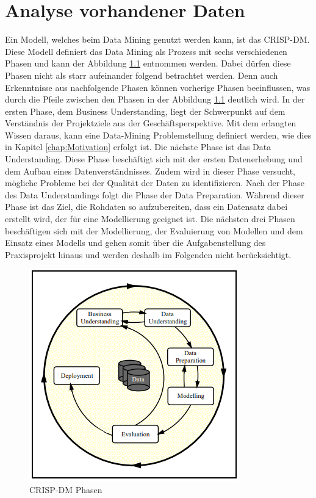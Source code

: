 \chapter{Analyse vorhandener Daten}
\label{chap:kapitel4}

Ein Modell, welches beim Data Mining genutzt werden kann, ist das \ac*{CRISP-DM}. Diese Modell definiert das Data Mining als Prozess mit sechs verschiedenen Phasen und kann der 
Abbildung \ref*{fig:CRISP-DM} entnommen werden. Dabei dürfen diese Phasen nicht als starr aufeinander folgend betrachtet werden. Denn auch Erkenntnisse aus nachfolgende Phasen können vorherige Phasen
beeinflussen, was durch die Pfeile zwischen den Phasen in der Abbildung \ref*{fig:CRISP-DM} deutlich wird. In der ersten Phase, dem Business Understanding, liegt der Schwerpunkt auf dem Verständnis 
der Projektziele aus der Geschäftsperspektive. Mit dem erlangten Wissen daraus, kann eine Data-Mining Problemstellung definiert werden, wie dies in Kapitel \ref*{chap:Motivation} erfolgt ist. 
Die nächste Phase ist das Data Understanding. Diese Phase beschäftigt sich mit der ersten Datenerhebung und dem Aufbau eines Datenverständnisses. Zudem wird in dieser Phase versucht, mögliche Probleme 
bei der Qualität der Daten zu identifizieren. Nach der Phase des Data Understandings folgt die Phase der Data Preparation. Während dieser Phase ist das Ziel, die Rohdaten so aufzubereiten, dass ein 
Datensatz dabei erstellt wird, der für eine Modellierung geeignet ist. Die nächsten drei Phasen beschäftigen sich mit der Modellierung, der Evaluierung von Modellen und dem Einsatz 
eines Modells und gehen somit über die Aufgabenstellung des Praxisprojekt hinaus und werden deshalb im Folgenden nicht berücksichtigt. \cite[S.5-7]{q8}

\begin{figure}[H]
    \centering
    \includegraphics[]{abbildungen/CrispDM.PNG}
    \caption{\acs{CRISP-DM} Phasen \cite[S.5]{q8}}
    \label{fig:CRISP-DM}
\end{figure}

